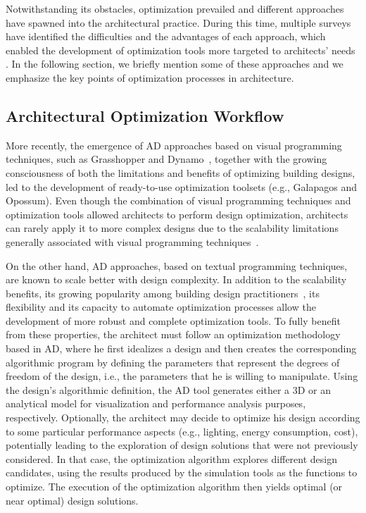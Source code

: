 Notwithstanding its obstacles, optimization prevailed and different approaches have spawned into the architectural practice. During this time, multiple surveys have identified the difficulties and the advantages of each approach, which enabled the development of optimization tools more targeted to architects' needs \cite{Attia2013,Nguyen2014,Shi2016}. In the following section, we briefly mention some of these approaches and we emphasize the key points of optimization processes in architecture.
	
\subsection{Architectural Optimization Workflow}
\label{ssec:AOW}
More recently, the emergence of \ac{AD} approaches based on visual programming techniques, such as Grasshopper and Dynamo~\cite{GRASSHOPPER,DYNAMOBIM}, together with the growing consciousness of both the limitations and benefits of optimizing building designs, led to the development of ready-to-use optimization toolsets (e.g., Galapagos and Opossum). Even though the combination of visual programming techniques and optimization tools allowed architects to perform design optimization, architects can rarely apply it to more complex designs due to the scalability limitations generally associated with visual programming techniques~\cite{Heijden2015}. 

On the other hand, \ac{AD} approaches, based on textual programming techniques, are known to scale better with design complexity. In addition to the scalability benefits, its growing popularity among building design practitioners~\cite{Kestelier2013}, its flexibility and its capacity to automate optimization processes allow the development of more robust and complete optimization tools. To fully benefit from these properties, the architect must follow an optimization methodology based in \ac{AD}, where he first idealizes a design and then creates the corresponding algorithmic program by defining the parameters that represent the degrees of freedom of the design, i.e., the parameters that he is willing to manipulate. Using the design's algorithmic definition, the \ac{AD} tool generates either a 3D or an analytical model for visualization and performance analysis purposes, respectively. Optionally, the architect may decide to optimize his design according to some particular performance aspects (e.g., lighting, energy consumption, cost), potentially leading to the exploration of design solutions that were not previously considered. In that case, the optimization algorithm explores different design candidates, using the results produced by the simulation tools as the functions to optimize. The execution of the optimization algorithm then yields optimal (or near optimal) design solutions.

